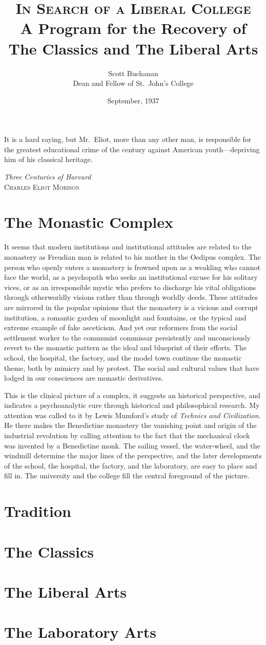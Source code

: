 \documentclass{memoir}
\title{\textsc{In Search of a Liberal College}\\ A Program for the Recovery of The Classics and The Liberal Arts}
\author{Scott Buchanan\\ Dean and Fellow of St.\ John's College}
\date{September, 1937}
\begin{document}
\maketitle

\epigraph{It is a hard saying, but Mr.\ Eliot, more than any
other man, is responsible for the greatest educational crime
of the century against American youth---depriving him of his
classical heritage.}{\emph{Three Centuries of Harvard}\\
\textsc{Charles Eliot Morison}}

\tableofcontents*

\chapter{The Monastic Complex}

It seems that modern institutions and institutional attitudes are
related to the monastery as Freudian man is related to his mother
in the Oedipus complex. The person who openly enters a monastery is
frowned upon as a weakling who cannot face the world, as a psychopath
who seeks an institutional excuse for his solitary vices, or as an
irresponsible mystic who prefers to discharge his vital obligations
through otherworldly visions rather than through worldly deeds. These
attitudes are mirrored in the popular opinions that the monastery is
a vicious and corrupt institution, a romantic garden of moonlight and
fountains, or the typical and extreme example of fake asceticism. And
yet our reformers from the social settlement worker to the communist
commissar persistently and unconsciously revert to the monastic pattern
as the ideal and blueprint of their efforts. The school, the hospital,
the factory, and the model town continue the monastic theme, both by
mimicry and by protest. The social and cultural values that have lodged
in our consciences are monastic derivatives.

This is the clinical picture of a complex, it suggests an historical
perspective, and indicates a psychoanalytic cure through historical
and philosophical research. My attention was called to it by Lewis
Mumford's study of \emph{Technics and Civilization}. He there makes the
Benedictine monastery the vanishing point and origin of the industrial
revolution by calling attention to the fact that the mechanical clock
was invented by a Benedictine monk. The sailing vessel, the water-wheel,
and the windmill determine the major lines of the perspective, and
the later developments of the school, the hospital, the factory, and
the laboratory, are easy to place and fill in. The university and the
college fill the central foreground of the picture.

\chapter{Tradition}

\chapter{The Classics}
\chapter{The Liberal Arts}
\chapter{The Laboratory Arts}
\end{document}
